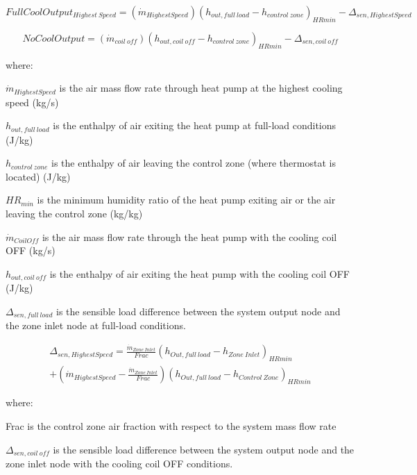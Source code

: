 \begin{equation}
FullCoolOutpu{t_{Highest~Speed}} = \left( {{{\dot m}_{HighestSpeed}}} \right){\left( {{h_{out,full~load}} - {h_{control~zone}}} \right)_{HRmin}} - {\Delta_{sen,HighestSpeed}}
\end{equation}

\begin{equation}
NoCoolOutput = \left( {{{\dot m}_{coil~off}}} \right){\left( {{h_{out,coil~off}} - {h_{control~zone}}} \right)_{HRmin}} - {\Delta_{sen,coil~off}}
\end{equation}

where:

\({\dot m}_{HighestSpeed}\) is the air mass flow rate through heat pump at the highest cooling speed (kg/s)

\(h_{out,full~load}\) is the enthalpy of air exiting the heat pump at full-load conditions (J/kg)

\(h_{control~zone}\) is the enthalpy of air leaving the control zone (where thermostat is located) (J/kg)

\(HR_{min}\) is the minimum humidity ratio of the heat pump exiting air or the air leaving the control zone (kg/kg)

\({\dot m}_{CoilOff}\) is the air mass flow rate through the heat pump with the cooling coil OFF (kg/s)

\(h_{out,coil~off}\) is the enthalpy of air exiting the heat pump with the cooling coil OFF (J/kg)

\(\Delta_{sen,full~load}\) is the sensible load difference between the system output node and the zone inlet node at full-load conditions.

\begin{equation}
\begin{split}
{\Delta_{sen,HighestSpeed}} = \frac{{{{\dot m}_{Zone~Inlet}}}}{Frac}{\left( {{h_{Out,full~load}} - {h_{Zone~Inlet}}} \right)_{HRmin}} \\
+ \left( {{{\dot m}_{HighestSpeed}} - \frac{{{{\dot m}_{Zone~Inlet}}}}{Frac}} \right){\left( {h_{Out,full~load} - {h_{Control~Zone}}} \right)_{HRmin}}
\end{split}
\end{equation}

where:

Frac is the control zone air fraction with respect to the system mass flow rate

\(\Delta_{sen,coil~off}\) is the sensible load difference between the system output node and the zone inlet node with the cooling coil OFF conditions.

